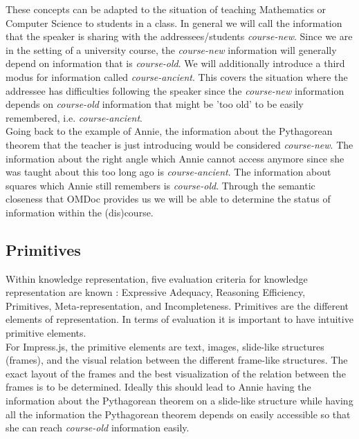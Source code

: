 \documentclass[twoside]{article}
\begin{document}
These concepts can be adapted to the situation of teaching Mathematics or Computer Science to students in a class. In general we will call the information that the speaker is sharing with the addressees/students \textit{course-new}. Since we are in the setting of a university course, the \textit{course-new} information will generally depend on information that is \textit{course-old}. We will additionally introduce a third modus for information called \textit{course-ancient}. This covers the situation where the addressee has difficulties following the speaker since the \textit{course-new} information depends on \textit{course-old} information that might be 'too old' to be easily remembered, i.e. \textit{course-ancient}.\\

Going back to the example of Annie, the information about the Pythagorean theorem that the teacher is just introducing would be considered \textit{course-new}. The information about the right angle which Annie cannot access anymore since she was taught about this too long ago is \textit{course-ancient}. The information about squares which Annie still remembers is \textit{course-old}. Through the semantic closeness that OMDoc provides us we will be able to determine the status of information within the (dis)course. \\

\subsection{Primitives}
\label{sec:primitives}

Within knowledge representation, five evaluation criteria for knowledge representation are known \cite{Kohlhase:Complog:base}: Expressive Adequacy, Reasoning Efficiency, Primitives, Meta-representation, and Incompleteness. Primitives are the different elements of representation. In terms of evaluation it is important to have intuitive primitive elements. \\

For Impress.js, the primitive elements are text, images, slide-like structures (frames), and the visual relation between the different frame-like structures. The exact layout of the frames and the best visualization of the relation between the frames is to be determined. Ideally this should lead to Annie having the information about the Pythagorean theorem on a slide-like structure while having all the information the Pythagorean theorem depends on easily accessible so that she can reach \textit{course-old} information easily.  
\end{document}

